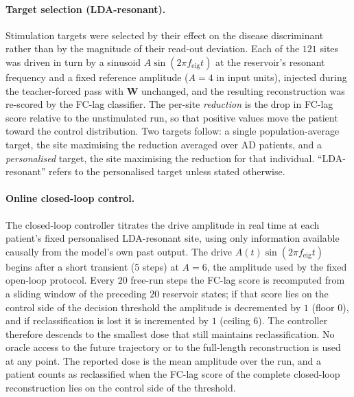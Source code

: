 \documentclass[11pt]{article}
\begin{document}
\paragraph{Target selection (LDA-resonant).}
Stimulation targets were selected by their effect on the disease discriminant
rather than by the magnitude of their read-out deviation. Each of the $121$ sites
was driven in turn by a sinusoid $A\sin(2\pi f_{\mathrm{eig}}t)$ at the
reservoir's resonant frequency and a fixed reference amplitude ($A=4$ in input
units), injected during the teacher-forced pass with $\mathbf{W}$ unchanged, and
the resulting reconstruction was re-scored by the FC-lag classifier. The per-site
\emph{reduction} is the drop in FC-lag score relative to the unstimulated run, so
that positive values move the patient toward the control distribution. Two
targets follow: a single population-average target, the site maximising the
reduction averaged over AD patients, and a \emph{personalised} target, the site
maximising the reduction for that individual. ``LDA-resonant'' refers to the
personalised target unless stated otherwise.

\paragraph{Online closed-loop control.}
The closed-loop controller titrates the drive amplitude in real time at each
patient's fixed personalised LDA-resonant site, using only information available
causally from the model's own past output. The drive
$A(t)\sin(2\pi f_{\mathrm{eig}}t)$ begins after a short transient ($5$ steps) at
$A=6$, the amplitude used by the fixed open-loop protocol. Every $20$ free-run
steps the FC-lag score is recomputed from a sliding window of the preceding $20$
reservoir states; if that score lies on the control side of the decision
threshold the amplitude is decremented by $1$ (floor $0$), and if reclassification
is lost it is incremented by $1$ (ceiling $6$). The controller therefore descends
to the smallest dose that still maintains reclassification. No oracle access to
the future trajectory or to the full-length reconstruction is used at any point.
The reported dose is the mean amplitude over the run, and a patient counts as
reclassified when the FC-lag score of the complete closed-loop reconstruction
lies on the control side of the threshold.
\end{document}

